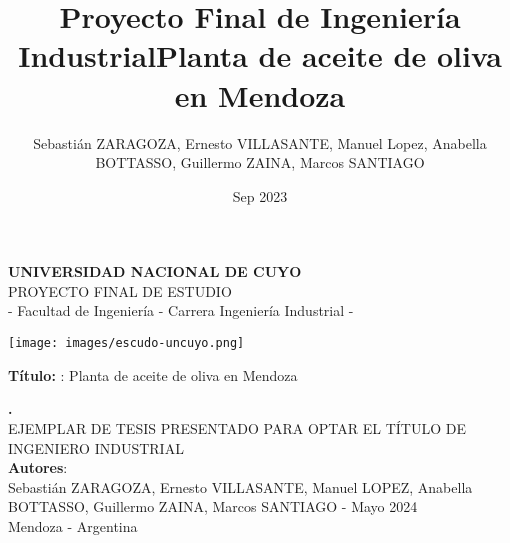 \documentclass[12pt,a4paper,oneside]{book}
\title{Proyecto Final de Ingeniería Industrial}
\author{Sebastián ZARAGOZA, Ernesto VILLASANTE, Manuel Lopez, Anabella BOTTASSO, Guillermo ZAINA, Marcos SANTIAGO}
\date{Sep 2023}
\begin{document}

\marginsize{3.0cm}{3.0cm}{4.0cm}{3.0cm}
\renewcommand*{\contentsname}{ÍNDICE}
\renewcommand*{\listtablename}{Índice de tablas}
\renewcommand*{\listfigurename}{Índice de figuras}
\renewcommand{\baselinestretch}{1.0}
\renewcommand{\appendixname}{Anexos}
\renewcommand{\appendixtocname}{Anexos}
\renewcommand{\appendixpagename}{Anexos}
\renewcommand{\thetable}{\arabic{chapter}.\arabic{table}}
\renewcommand*{\tablename}{Tabla}
\renewcommand*{\chaptername}{Capítulo}
\renewcommand*{\thechapter}{\Roman{chapter}}
\renewcommand{\thesection}{\arabic{chapter}.\arabic{section}}
\renewcommand{\figurename}{Figura}
\renewcommand{\thefigure}{\arabic{chapter}.\arabic{figure}}
\renewcommand{\theequation}{\arabic{chapter}.\arabic{equation}}




\begin{titlepage}
 
\begin{center}
 
 {\huge \bf UNIVERSIDAD NACIONAL DE CUYO}\\[1.2cm]
 
{\Large PROYECTO FINAL DE ESTUDIO}\\{\Large  -  Facultad de Ingeniería - Carrera Ingeniería Industrial -}\\[2.0cm]


\begin{center}
\texttt{[image: images/escudo-uncuyo.png]}
\end{center}

\vspace{1.7cm}
{{\bf Título: }: }Planta de aceite de oliva en Mendoza
\title{Planta de aceite de oliva en Mendoza} %
{\bf \large . }\\[1.7cm] %


{EJEMPLAR DE TESIS PRESENTADO PARA OPTAR EL TÍTULO DE INGENIERO INDUSTRIAL}\\[0.5cm]
 
{{\bf Autores}: }\\[0.5cm] %

{\large Sebastián ZARAGOZA, Ernesto VILLASANTE, Manuel LOPEZ, Anabella BOTTASSO, Guillermo ZAINA, Marcos SANTIAGO - Mayo 2024}\\[0.8cm] %
{Mendoza - Argentina}
\end{center}

\end{titlepage}
\end{document}
